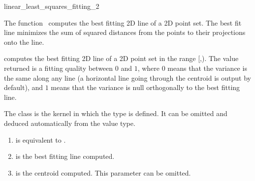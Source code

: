 
\begin{ccRefFunction}{linear_least_squares_fitting_2}  


\ccDefinition
  
The function \ccRefName\ computes the best fitting 2D line of a 2D
point set. The best fit line minimizes the sum of squared distances
from the points to their projections onto the line.


{ computes the best fitting 2D line of a 2D point set in the range
[,). The value returned is a fitting quality
between $0$ and $1$, where $0$ means that the variance is the same
along any line (a horizontal line going through the centroid is output
by default), and $1$ means that the variance is null orthogonally
to the best fitting line. }

The class  is the kernel in which the type
 is defined. It can be omitted and
deduced automatically from the value type.


\begin{enumerate}
   \item  {} is equivalent to .
   \item  {} is the best fitting line computed.
   \item  {} is the centroid computed. This parameter can be
          omitted.
\end{enumerate}


\end{ccRefFunction}
